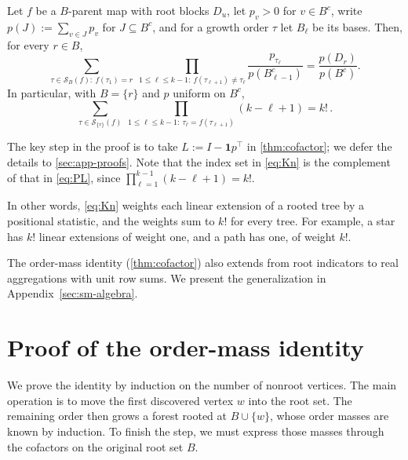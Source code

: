 \documentclass[onefignum,onetabnum]{siamart250211}
\numberwithin{theorem}{section}
\numberwithin{equation}{section}
\newcommand{\Orders}{\mathcal{S}}
\newcommand{\one}{\mathbf{1}}
\begin{document}
\begin{corollary}\label{cor:PL}
Let $f$ be a $B$-parent map with root blocks $D_u$, let $p_v>0$ for
$v\in B^c$, write $p(J):=\sum_{v\in J}p_v$ for $J\subseteq B^c$, and for a growth order
$\tau$ let $B_\ell$ be its bases. Then, for every $r\in B$,
\begin{equation}\label{eq:PL}
\sum_{\tau\in\Orders_B(f):\ f(\tau_1)=r}\
\prod_{1\le \ell\le k-1:\ f(\tau_{\ell+1})\ne\tau_\ell}\frac{p_{\tau_\ell}}{p(B_{\ell-1}^c)}
=\frac{p(D_r)}{p(B^c)} .
\end{equation}
In particular, with $B=\{r\}$ and $p$ uniform on $B^c$,
\begin{equation}\label{eq:Kn}
\sum_{\tau\in\Orders_{\{r\}}(f)}\
\prod_{1\le \ell\le k-1:\ \tau_\ell=f(\tau_{\ell+1})}(k-\ell+1)=k!\,.
\end{equation}
\end{corollary}

The key step in the proof is to take $L:=I-\one p^{\top}$ in
\cref{thm:cofactor}; we defer the details to \cref{sec:app-proofs}.
Note that the index set in \eqref{eq:Kn}
is the complement of that in \eqref{eq:PL}, since
$\prod_{\ell=1}^{k-1}(k-\ell+1)=k!$.

\begin{remark}\label{rem:linext}
In other words, \eqref{eq:Kn} weights each linear extension of
a rooted tree by a positional statistic, and the weights sum to $k!$
for every tree. For example, a star has
$k!$ linear extensions of weight one, and a path has one, of weight
$k!$. 
\end{remark}

\begin{remark}
The order-mass identity (\cref{thm:cofactor}) also extends from root
indicators to real aggregations with unit row sums. We present the generalization in Appendix~\ref{sec:sm-algebra}.
\end{remark}


\section{Proof of the order-mass identity}\label{sec:proof}

We prove the identity by induction on the number of nonroot vertices.
The main operation is to move the first discovered vertex $w$ into
the root set. The remaining order then grows a forest rooted at
$B\cup\{w\}$, whose order masses are known by induction. To finish the
step, we must express those masses through the cofactors on the
original root set $B$.
\end{document}
